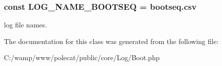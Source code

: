 \subsubsection[{L\+O\+G\+\_\+\+N\+A\+M\+E\+\_\+\+B\+O\+O\+T\+S\+E\+Q}]{\setlength{\rightskip}{0pt plus 5cm}const L\+O\+G\+\_\+\+N\+A\+M\+E\+\_\+\+B\+O\+O\+T\+S\+E\+Q = \textquotesingle{}bootseq.\+csv\textquotesingle{}}\label{class_able_polecat___log___boot_a645cd359836227fd9f770339a3147e7b}
log file names. 

The documentation for this class was generated from the following file\+:\begin{DoxyCompactItemize}
\item 
C\+:/wamp/www/polecat/public/core/\+Log/Boot.\+php\end{DoxyCompactItemize}
